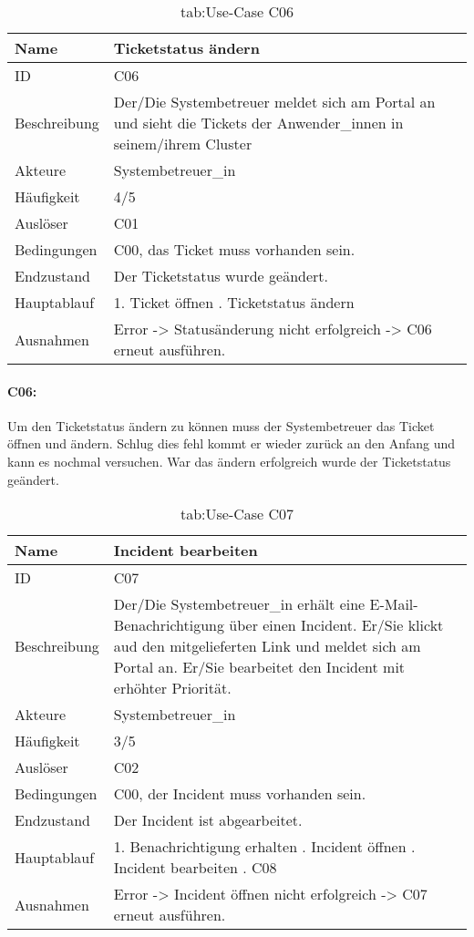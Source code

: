 \newpage
\begin{table}[h]
	\begin{tabular}{|p{3cm}|p{10.7cm}|}
		\hline
		Name & Ticketstatus ändern\\
		\hline
		ID &  C06\\
		\hline
		Beschreibung & Der/Die Systembetreuer meldet sich am Portal an und sieht die Tickets der Anwender\_innen in seinem/ihrem Cluster\\
		\hline
		Akteure & Systembetreuer\_in\\
		\hline
		Häufigkeit & 4/5\\
		\hline
		Auslöser & C01\\
		\hline
		Bedingungen & C00, das Ticket muss vorhanden sein.\\
		\hline
		Endzustand & Der Ticketstatus wurde geändert.\\
		\hline
		Hauptablauf & 1. Ticket öffnen \newline2. Ticketstatus ändern\\
		\hline
		Ausnahmen & Error -> Statusänderung nicht erfolgreich -> C06 erneut ausführen.\\
		\hline
	\end{tabular}
	\caption{tab:Use-Case C06}
\end{table}
\label{tab:tab:Use-Case C06}

\paragraph{C06:}
Um den Ticketstatus ändern zu können muss der Systembetreuer das Ticket öffnen und ändern. Schlug dies fehl kommt er wieder zurück an den Anfang und kann es nochmal versuchen. War das ändern erfolgreich wurde der Ticketstatus geändert.

\newpage
\begin{table}[h]
	\begin{tabular}{|p{3cm}|p{10.7cm}|}
		\hline
		Name & Incident bearbeiten\\
		\hline
		ID &  C07\\
		\hline
		Beschreibung & Der/Die Systembetreuer\_in erhält eine E-Mail-Benachrichtigung über einen Incident. Er/Sie klickt aud den mitgelieferten Link und meldet sich am Portal an. Er/Sie bearbeitet den Incident mit erhöhter Priorität.\\
		\hline
		Akteure & Systembetreuer\_in\\
		\hline
		Häufigkeit & 3/5\\
		\hline
		Auslöser & C02\\
		\hline
		Bedingungen & C00, der Incident muss vorhanden sein.\\
		\hline
		Endzustand & Der Incident ist abgearbeitet.\\
		\hline
		Hauptablauf & 1. Benachrichtigung erhalten \newline2. Incident öffnen \newline3. Incident bearbeiten \newline4. C08\\
		\hline
		Ausnahmen & Error -> Incident öffnen nicht erfolgreich -> C07 erneut ausführen.\\
		\hline
	\end{tabular}
	\caption{tab:Use-Case C07}
\end{table}
\label{tab:tab:Use-Case C07}


